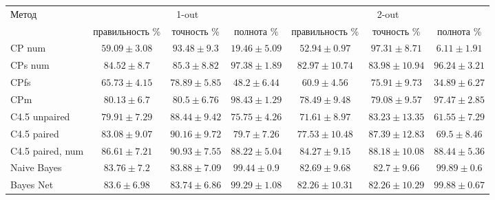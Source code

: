 \begin{sidewaystable}[ph!]
		\bigskip\bigskip
		
		\begin{tabular}{|l|ccc|ccc|}
			\hline
			\multirow{2}{*}{Метод}   & \multicolumn{3}{c|}{1-out}                             & \multicolumn{3}{c|}{2-out}         \\ \cline{2-7}  
			& правильность \%  & точность \%      & полнота \%       & правильность \%   & точность \%       & полнота \% \rule{0pt}{2.4ex} \\ \hline
			CP num    				 & $59.09 \pm 3.08$ & $93.48 \pm 9.3$  & $19.46 \pm 5.09$ & $52.94 \pm 0.97$  & $97.31 \pm 8.71$  & $6.11 \pm 1.91$ \rule{0pt}{2.4ex} \\ 
			CPs num					 & $84.52 \pm 8.7$  & $85.3 \pm 8.82$  & $97.38 \pm 1.89$ & $82.97 \pm 10.74$ & $83.98 \pm 10.94$ & $96.24 \pm 3.21$ \\
			CPfs					 & $65.73 \pm 4.15$ & $78.89 \pm 5.85$ & $48.2 \pm 6.44$  & $60.9 \pm 4.56$   & $75.91 \pm 9.73$  & $34.89 \pm 6.27$ \\
			CPm						 & $80.13 \pm 6.7$  & $80.5 \pm 6.76 $ & $98.43 \pm 1.29$ & $78.49 \pm 9.48$  & $79.08 \pm 9.57$  & $97.47 \pm 2.85$ \\ 
			C4.5 unpaired			 & $79.91 \pm 7.29$ & $88.44 \pm 9.42$ & $75.75 \pm 4.26$ & $71.61 \pm 8.97$  & $83.23 \pm 13.35$ & $61.55 \pm 7.29$ \\ 
			C4.5 paired  			 & $83.08 \pm 9.07$ & $90.16 \pm 9.72$ & $79.7 \pm 7.26$  & $77.53 \pm 10.48$ & $87.39 \pm 12.83$ & $69.5 \pm 8.46$ \\ 
			C4.5 paired, num 	     & $86.61 \pm 7.21$ & $90.93 \pm 7.55$ & $88.22 \pm 5.04$ & $84.27 \pm 9.15$  & $88.18 \pm 10.08$ & $88.44 \pm 5.36$ \\
			Naive Bayes  			 & $83.76 \pm 7.2$  & $83.88 \pm 7.09$ & $99.44 \pm 0.9$  & $82.69 \pm 9.68$  & $82.7 \pm 9.66$   & $99.89 \pm 0.6$ \\ 
			Bayes Net  				 & $83.6 \pm 6.98$  & $83.74 \pm 6.86$ & $99.29 \pm 1.08$ & $82.26 \pm 10.31$ & $82.26 \pm 10.29$ & $99.88 \pm 0.67$ \\ 
			\hline
		\end{tabular}
		\label{tbl:sushi_results}
	\end{sidewaystable}
	
